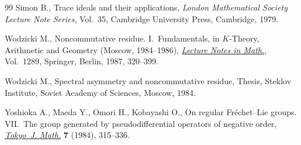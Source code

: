 \documentclass[pdftex]{sigma}
\begin{document}
\begin{thebibliography}{99}
Simon B., Trace ideals and their applications, \textit{London Mathematical
  Society Lecture Note Series}, Vol.~35, Cambridge University Press, Cambridge,
  1979.

Wodzicki M., Noncommutative residue. {I}.~{F}undamentals, in {$K$}-Theory,
  Arithmetic and Geo\-met\-ry ({M}oscow, 1984--1986), \href{http://dx.doi.org/10.1007/BFb0078372}{\textit{Lecture Notes in
  Math.}}, Vol.~1289, Springer, Berlin, 1987, 320--399.

Wodzicki M., Spectral asymmetry and noncommutative residue, Thesis, Steklov Institute, Soviet Academy of Sciences, Moscow, 1984.


Yoshioka A., Maeda Y., Omori H., Kobayashi O., On regular {F}r\'echet--{L}ie
  groups. {VII}.~{T}he group generated by pseudodif\/ferential operators of
  negative order, \href{http://dx.doi.org/10.3836/tjm/1270151730}{\textit{Tokyo~J. Math.}} \textbf{7} (1984), 315--336.

\end{thebibliography}\LastPageEnding
\end{document}
